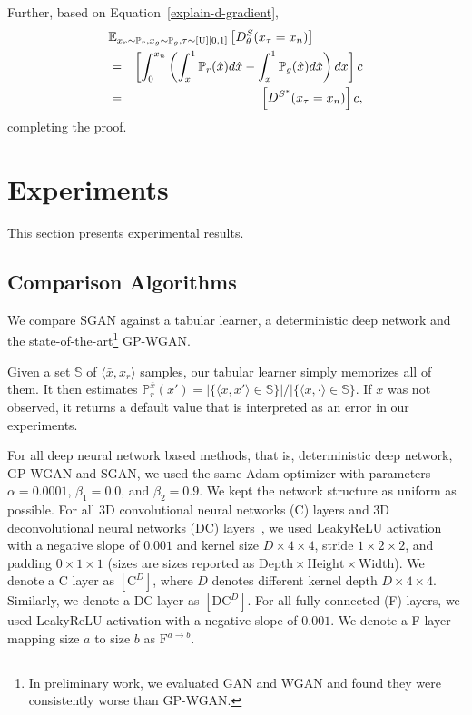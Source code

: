 \documentclass[letterpaper]{article} %
\begin{document}
Further,
based on Equation~\eqref{explain-d-gradient},
\begin{eqnarray}
\lefteqn{\mathbb{E}_{x_r\sim\mathbb{P}_r,x_g\sim\mathbb{P}_g, \tau \sim [\text{U}][0,1]} \left[ D_{\theta}^S(x_{\tau}=x_n) \right]} \nonumber\\
    &=& \left[\int^{x_n}_{0} \left( \int_{x}^{1} \mathbb{P}_r(\hat{x}) d \hat{x} - \int_{x}^{1} \mathbb{P}_g(\hat{x}) d \hat{x} \right) d x \right] c \nonumber\\
    &=& \left[ D^{S^\ast}(x_{\tau}=x_n) \right] c,
\end{eqnarray}
completing the proof.

\section{Experiments}

This section presents experimental results.

\subsection{Comparison Algorithms}

We compare SGAN against a tabular learner, a deterministic deep network and the state-of-the-art\footnote{In preliminary work, we evaluated GAN and WGAN and found they were consistently worse than GP-WGAN.} GP-WGAN.

Given a set $\mathbb{S}$ of $\langle \bar{x},x_r\rangle$ samples, our tabular learner simply memorizes all of them. It then estimates $\mathbb{P}^{\bar{x}}_{r}(x') = |\{\langle \bar{x},x'\rangle \in \mathbb{S}\}|/ |\{ \langle \bar{x},\cdot\rangle \in \mathbb{S}\}$. If $\bar{x}$ was not observed, it returns a default value that is interpreted as an error in our experiments.

For all deep neural network based methods, that is, deterministic deep network, GP-WGAN and SGAN, we used the same Adam optimizer with parameters $\alpha=0.0001$, $\beta_1=0.0$, and $\beta_2=0.9$. We kept the network structure as uniform as possible.  For all 3D convolutional neural networks (C) layers and 3D deconvolutional neural networks (DC) layers~\cite{ji20133d}, we used LeakyReLU activation with a negative slope of $0.001$ and kernel size $D\times4\times4$, stride $1\times2\times2$, and padding $0\times1\times1$ (sizes are sizes reported as $\text{Depth}\times\text{Height}\times\text{Width}$).
We denote a C layer as $[\text{C}^D]$, where $D$ denotes different kernel depth $D\times4\times4$. Similarly, we denote a DC layer as $[\text{DC}^D]$. For all fully connected (F) layers, we used LeakyReLU activation with a negative slope of $0.001$. We denote a F layer mapping size $a$ to size $b$ as $\text{F}^{a\rightarrow b}$.
\end{document}
